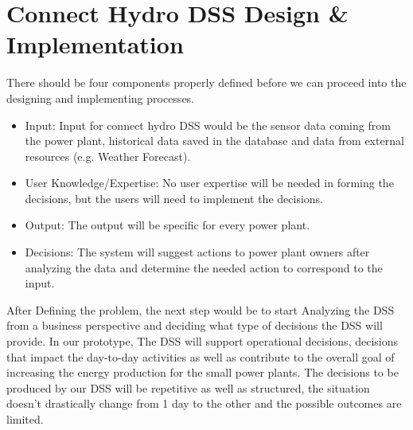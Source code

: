 \section{Connect Hydro DSS Design \& Implementation}
There should be four components properly defined before we can proceed into the designing and implementing processes.
\begin{itemize}
	\item Input: Input for connect hydro DSS would be the sensor data coming from the power plant, historical data saved in the database and data from external resources (e.g. Weather Forecast).
	\item User Knowledge/Expertise: No user expertise will be needed in forming the decisions, but the users will need to implement the decisions.
	\item Output: The output will be specific for every power plant.
	\item Decisions: The system will suggest actions to power plant owners after analyzing the data and determine the needed action to correspond to the input.
\end{itemize}
After Defining the problem, the next step would be to start Analyzing the DSS from a business perspective and deciding what type of decisions the DSS will provide. In our prototype, The DSS will support operational decisions, decisions that impact the day-to-day activities as well as contribute to the overall goal of increasing the energy production for the small power plants. The decisions to be produced by our DSS will be repetitive as well as structured, the situation doesn't drastically change from 1 day to the other and the possible outcomes are limited.

